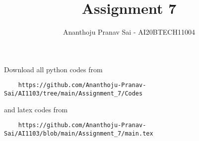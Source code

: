 \documentclass[journal,12pt,twocolumn]{IEEEtran}
\DeclareMathOperator*{\Res}{Res}
\begin{document}
\newcommand{\BEQA}{\begin{eqnarray}}
\newcommand{\EEQA}{\end{eqnarray}}
\newcommand{\define}{\stackrel{\triangle}{=}}

\raggedbottom
\setlength{\parindent}{0pt}
\providecommand{\mbf}{\mathbf}
\providecommand{\pr}[1]{\ensuremath{\Pr\left(#1\right)}}
\providecommand{\qfunc}[1]{\ensuremath{Q\left(#1\right)}}
\providecommand{\sbrak}[1]{\ensuremath{{}\left[#1\right]}}
\providecommand{\lsbrak}[1]{\ensuremath{{}\left[#1\right.}}
\providecommand{\rsbrak}[1]{\ensuremath{{}\left.#1\right]}}
\providecommand{\brak}[1]{\ensuremath{\left(#1\right)}}
\providecommand{\lbrak}[1]{\ensuremath{\left(#1\right.}}
\providecommand{\rbrak}[1]{\ensuremath{\left.#1\right)}}
\providecommand{\cbrak}[1]{\ensuremath{\left\{#1\right\}}}
\providecommand{\lcbrak}[1]{\ensuremath{\left\{#1\right.}}
\providecommand{\rcbrak}[1]{\ensuremath{\left.#1\right\}}}
\theoremstyle{remark}
\newtheorem{rem}{Remark}
\newcommand{\sgn}{\mathop{\mathrm{sgn}}}
\providecommand{\abs}[1]{\vert#1\vert}
\providecommand{\res}[1]{\Res\displaylimits_{#1}} 
\providecommand{\norm}[1]{\lVert#1\rVert}
\providecommand{\mtx}[1]{\mathbf{#1}}
\providecommand{\mean}[1]{E[ #1 ]}
\providecommand{\fourier}{\overset{\mathcal{F}}{ \rightleftharpoons}}
\providecommand{\system}{\overset{\mathcal{H}}{ \longleftrightarrow}}
\newcommand{\solution}{\noindent \textbf{Solution: }}
\newcommand{\cosec}{\,\text{cosec}\,}
\providecommand{\dec}[2]{\ensuremath{\overset{#1}{\underset{#2}{\gtrless}}}}
\newcommand{\myvec}[1]{\ensuremath{\begin{pmatrix}#1\end{pmatrix}}}
\newcommand{\mydet}[1]{\ensuremath{\begin{vmatrix}#1\end{vmatrix}}}
\makeatletter
{}
\makeatother
\let\StandardTheFigure\thefigure
\let\vec\mathbf
\renewcommand{\thefigure}{\theproblem}
\def\putbox#1#2#3{\makebox[0in][l]{\makebox[#1][l]{}\raisebox{\baselineskip}[0in][0in]{\raisebox{#2}[0in][0in]{#3}}}}
     \def\rightbox#1{\makebox[0in][r]{#1}}
     \def\centbox#1{\makebox[0in]{#1}}
     \def\topbox#1{\raisebox{-\baselineskip}[0in][0in]{#1}}
     \def\midbox#1{\raisebox{-0.5\baselineskip}[0in][0in]{#1}}
\vspace{3cm}
\title{Assignment 7}
\author{Ananthoju Pranav Sai - AI20BTECH11004}
\maketitle
\newpage
\bigskip
\renewcommand{\thefigure}{\theenumi}
\renewcommand{\thetable}{\theenumi}
Download all python codes from 
\begin{lstlisting}
    https://github.com/Ananthoju-Pranav-Sai/AI1103/tree/main/Assignment_7/Codes
\end{lstlisting}
%
and latex codes from 
%
\begin{lstlisting}
    https://github.com/Ananthoju-Pranav-Sai/AI1103/blob/main/Assignment_7/main.tex
\end{lstlisting}
\end{document}
